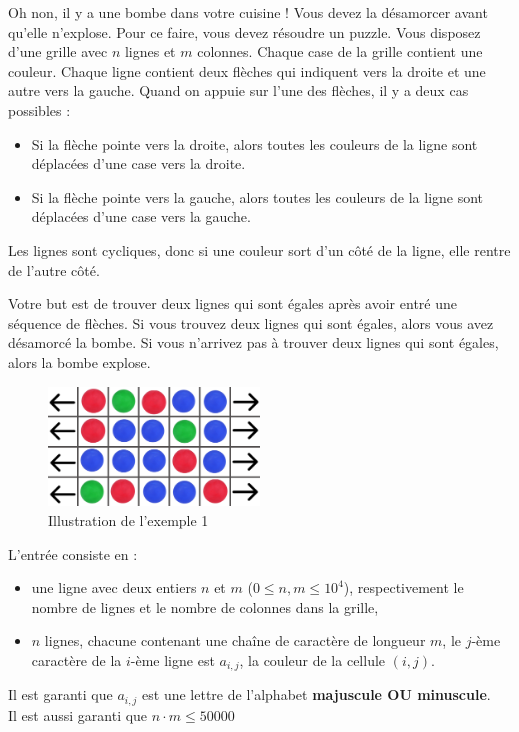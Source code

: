 \problemname{\problemyamlname}


Oh non, il y a une bombe dans votre cuisine ! Vous devez la désamorcer avant qu'elle n'explose. Pour ce faire, vous devez résoudre un puzzle.
Vous disposez d'une grille avec $n$ lignes et $m$ colonnes. Chaque case de la grille contient une couleur. Chaque ligne contient deux flèches qui indiquent vers la droite et une autre vers la gauche.
Quand on appuie sur l'une des flèches, il y a deux cas possibles :
\begin{itemize}
    \item Si la flèche pointe vers la droite, alors toutes les couleurs de la ligne sont déplacées d'une case vers la droite.
    \item Si la flèche pointe vers la gauche, alors toutes les couleurs de la ligne sont déplacées d'une case vers la gauche.
\end{itemize}
Les lignes sont cycliques, donc si une couleur sort d'un côté de la ligne, elle rentre de l'autre côté.

Votre but est de trouver deux lignes qui sont égales après avoir entré une séquence de flèches. Si vous trouvez deux lignes qui sont égales, alors vous avez désamorcé la bombe. Si vous n'arrivez pas à trouver deux lignes qui sont égales, alors la bombe explose.

\begin{figure}[H]
    \centering
    \includegraphics[width=0.5\textwidth]{illustration.png}
    \caption{Illustration de l'exemple 1}
\end{figure}

\begin{Input}
    L'entrée consiste en :
    \begin{itemize}
        \item une ligne avec deux entiers $n$ et $m$ ($0\leq n,m \leq 10^4$), respectivement le nombre de lignes et le nombre de colonnes dans la grille,
        \item $n$ lignes, chacune contenant une chaîne de caractère de longueur $m$, le $j$-ème caractère de la $i$-ème ligne est $a_{i,j}$, la couleur de la cellule $(i,j)$.
    \end{itemize}
    Il est garanti que $a_{i,j}$ est une lettre de l'alphabet \textbf{majuscule OU minuscule}.\\
    Il est aussi garanti que $n \cdot m \leq 50000$
\end{Input}

